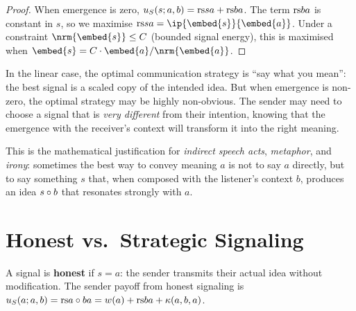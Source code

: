 \begin{proof}
When emergence is zero, $u_S(s; a, b) = \mathrm{rs}{s}{a} + \mathrm{rs}{b}{a}$.  The term
$\mathrm{rs}{b}{a}$ is constant in $s$, so we maximise $\rs{s}{a} = \ip{\embed{s}}{\embed{a}}$.
Under a constraint $\nrm{\embed{s}} \leq C$ (bounded signal energy), this
is maximised when $\embed{s} = C \cdot \embed{a} / \nrm{\embed{a}}$.
\end{proof}

\begin{interpretation}
In the linear case, the optimal communication strategy is ``say what you
mean'': the best signal is a scaled copy of the intended idea.  But when
emergence is non-zero, the optimal strategy may be highly non-obvious.  The
sender may need to choose a signal that is \emph{very different} from their
intention, knowing that the emergence with the receiver's context will
transform it into the right meaning.

This is the mathematical justification for \emph{indirect speech acts},
\emph{metaphor}, and \emph{irony}: sometimes the best way to convey
meaning $a$ is not to say $a$ directly, but to say something $s$ that,
when composed with the listener's context $b$, produces an idea
$s \circ b$ that resonates strongly with $a$.
\end{interpretation}

\section{Honest vs.\ Strategic Signaling}

\begin{definition}
\label{def:honest}
A signal is \textbf{honest} if $s = a$: the sender transmits their actual idea
without modification.  The sender payoff from honest signaling is
$u_S(a; a, b) = \mathrm{rs}{a \circ b}{a} = w(a) + \mathrm{rs}{b}{a} + \kappa(a, b, a)$.
\end{definition}

